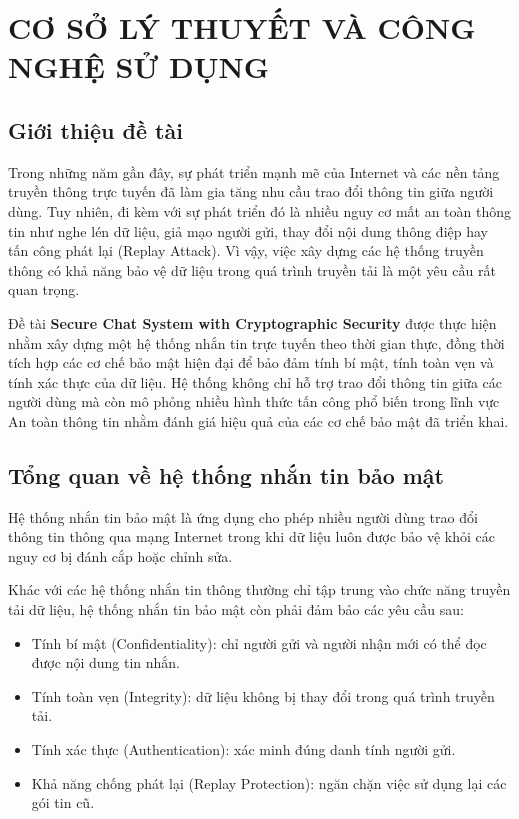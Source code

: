 \chapter{CƠ SỞ LÝ THUYẾT VÀ CÔNG NGHỆ SỬ DỤNG}

\section{Giới thiệu đề tài}

Trong những năm gần đây, sự phát triển mạnh mẽ của Internet và các nền tảng truyền thông trực tuyến đã làm gia tăng nhu cầu trao đổi thông tin giữa người dùng. Tuy nhiên, đi kèm với sự phát triển đó là nhiều nguy cơ mất an toàn thông tin như nghe lén dữ liệu, giả mạo người gửi, thay đổi nội dung thông điệp hay tấn công phát lại (Replay Attack). Vì vậy, việc xây dựng các hệ thống truyền thông có khả năng bảo vệ dữ liệu trong quá trình truyền tải là một yêu cầu rất quan trọng.

Đề tài \textbf{Secure Chat System with Cryptographic Security} được thực hiện nhằm xây dựng một hệ thống nhắn tin trực tuyến theo thời gian thực, đồng thời tích hợp các cơ chế bảo mật hiện đại để bảo đảm tính bí mật, tính toàn vẹn và tính xác thực của dữ liệu. Hệ thống không chỉ hỗ trợ trao đổi thông tin giữa các người dùng mà còn mô phỏng nhiều hình thức tấn công phổ biến trong lĩnh vực An toàn thông tin nhằm đánh giá hiệu quả của các cơ chế bảo mật đã triển khai.

\section{Tổng quan về hệ thống nhắn tin bảo mật}

Hệ thống nhắn tin bảo mật là ứng dụng cho phép nhiều người dùng trao đổi thông tin thông qua mạng Internet trong khi dữ liệu luôn được bảo vệ khỏi các nguy cơ bị đánh cắp hoặc chỉnh sửa.

Khác với các hệ thống nhắn tin thông thường chỉ tập trung vào chức năng truyền tải dữ liệu, hệ thống nhắn tin bảo mật còn phải đảm bảo các yêu cầu sau:

\begin{itemize}
\item Tính bí mật (Confidentiality): chỉ người gửi và người nhận mới có thể đọc được nội dung tin nhắn.
\item Tính toàn vẹn (Integrity): dữ liệu không bị thay đổi trong quá trình truyền tải.
\item Tính xác thực (Authentication): xác minh đúng danh tính người gửi.
\item Khả năng chống phát lại (Replay Protection): ngăn chặn việc sử dụng lại các gói tin cũ.
\end{itemize}

